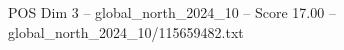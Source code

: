 \begin{textsample}{POS Dim 3 – global\_north\_2024\_10 – Score 17.00 – global\_north\_2024\_10/115659482.txt}
\end{textsample}
